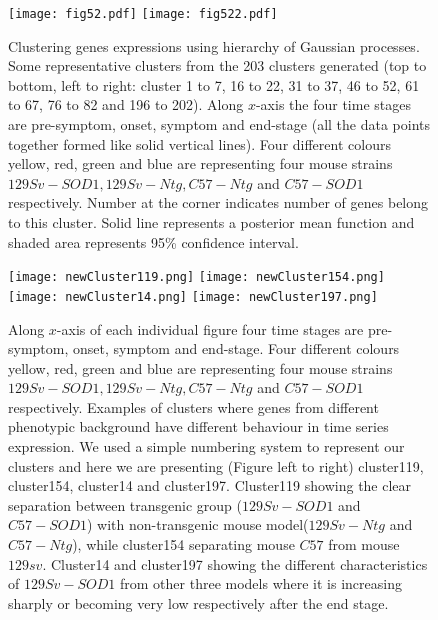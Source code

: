 \begin{figure}
 \begin{center}
    \texttt{[image: fig52.pdf]}
    \texttt{[image: fig522.pdf]}
    \caption [Clustering genes expressions using hierarchy of Gaussian processes] 
    {Clustering genes expressions using hierarchy of Gaussian processes. Some representative clusters from the 203 clusters generated (top to bottom, left to right: cluster 1 to 7, 16 to 22, 31 to 37, 46 to 52, 61 to 67, 76 to 82 and 196 to 202). Along $x$-axis the four time stages are pre-symptom, onset, symptom and end-stage (all the data points together formed like solid vertical lines). Four different colours yellow, red, green and blue are representing four mouse strains $129Sv-SOD1, 129Sv-Ntg, C57-Ntg$ and $C57-SOD1$ respectively. Number at the corner indicates number of genes belong to this cluster. Solid line represents a posterior mean function and shaded area represents 95\% confidence interval.\label{fig:fewClusters}}
 \end{center}
\end{figure}

\begin{figure}
 \begin{center}
 \texttt{[image: newCluster119.png]}
 \texttt{[image: newCluster154.png]}
 \texttt{[image: newCluster14.png]}
 \texttt{[image: newCluster197.png]}
  \caption [Few examples of clusters with different dynamics]
  {Along $x$-axis of each individual figure four time stages are pre-symptom, onset, symptom and end-stage. Four different colours yellow, red, green and blue are representing four mouse strains $129Sv-SOD1, 129Sv-Ntg, C57-Ntg$ and $C57-SOD1$ respectively. Examples of clusters where genes from different phenotypic background have different behaviour in time series expression. We used a simple numbering system to represent our clusters and here we are presenting (Figure left to  right) cluster119, cluster154, cluster14 and cluster197. Cluster119 showing the clear separation between transgenic group ($129Sv-SOD1$ and $C57-SOD1$) with non-transgenic mouse model($129Sv-Ntg$ and $C57-Ntg$), while cluster154 separating mouse $C57$ from mouse $129sv$. Cluster14 and cluster197 showing the different characteristics of $129Sv-SOD1$ from other three models where it is increasing sharply or becoming very low respectively after the end stage. \label{fig:fourSampleClusters}}
 \end{center}
\end{figure}


